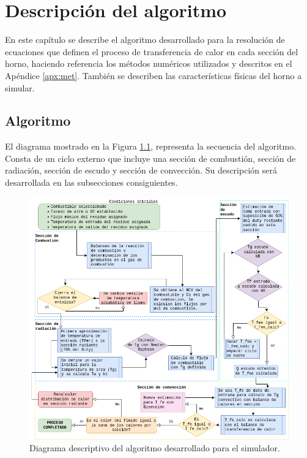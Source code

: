 \chapter{Descripción del algoritmo}
\par En este capítulo se describe el algoritmo desarrollado para la resolución de ecuaciones que definen el proceso de transferencia de calor en cada sección del horno, haciendo referencia los métodos numéricos utilizados y descritos en el Apéndice \ref{apx:met}. También se describen las características físicas del horno a simular.

\section{Algoritmo}
\par El diagrama mostrado en la Figura \ref{fig:diagrama-algo}, representa la secuencia del algoritmo. Consta de un ciclo externo que incluye una sección de combustión, sección de radiación, sección de escudo y sección de convección. Su descripción será desarrollada en las subsecciones consiguientes.
\begin{figure}[hbt]
\begin{center}
\includegraphics[scale=0.45]{images/diagrama-algo}
\caption[Diagrama de algoritmo]{Diagrama descriptivo del algoritmo desarrollado para el simulador.}
\label{fig:diagrama-algo}
\end{center}
\end{figure}

